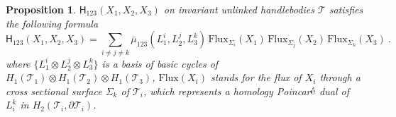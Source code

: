 \documentclass[12pt]{article}
\newtheorem{proposition}[theorem]{Proposition}
\begin{document}
\begin{proposition}
 $\mathsf{H}_{123}(X_1,X_2,X_3)$ on invariant unlinked handlebodies $\mathcal{T}$ satisfies the following formula
 \begin{equation}\label{eq:helicity-fluxes}
 \mathsf{H}_{123}(X_1,X_2,X_3)=\sum_{i\neq j\neq k} \bar{\mu}_{123}(L^i_1, L^j_2, L^k_3)\,\text{Flux}_{\Sigma_i}(X_1)\,\text{Flux}_{\Sigma_j}(X_2)\,\text{Flux}_{\Sigma_k}(X_3)\ .
 \end{equation}
where $\{L^i_1\otimes L^j_2\otimes L^k_3\}$ is a basis of basic cycles of $H_1(\mathcal{T}_1)\otimes H_1(\mathcal{T}_2)\otimes H_1(\mathcal{T}_3)$, $\text{Flux}(X_i)$ stands for the flux of $X_i$ through a cross sectional surface $\Sigma_k$ of $\mathcal{T}_i$, which represents a homology Poincar$\acute{\rm e}$ dual of $L^k_i$ in $H_2(\mathcal{T}_i,\partial\mathcal{T}_i)$.

\end{proposition}
\end{document}
